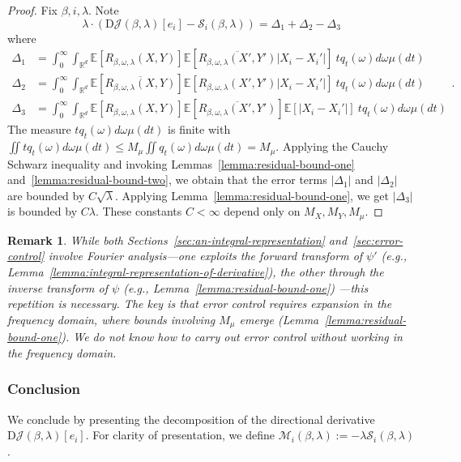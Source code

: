 \documentclass[sn-mathphys-num]{sn-jnl}%
\numberwithin{equation}{section}
\newcommand{\R}{\mathbb{R}}
\newcommand{\E}{\mathbb{E}}
\theoremstyle{thmstyleone}%
\theoremstyle{thmstyletwo}%
\newtheorem{remark}{Remark}%
\theoremstyle{thmstylethree}%
\begin{document}
\begin{proof} 
Fix $\beta, i, \lambda$. Note 
\begin{equation*}
	\lambda \cdot (\mathrm{D}\mathcal{J}(\beta, \lambda)[e_i] -  \mathcal{S}_i(\beta, \lambda)) = \Delta_1 + \Delta_2 - \Delta_3
\end{equation*}
where 
\begin{equation*}
\begin{split} 
	\Delta_1&= \int_0^\infty \int_{\R^d} \E[R_{\beta, \omega, \lambda}(X, Y)] \E[\overline{R_{\beta, \omega, \lambda}(X', Y')}|X_i - X_i'|] ~t q_t(\omega) d\omega \mu(dt) \\
	\Delta_2&= \int_0^\infty \int_{\R^d} \E[\overline{R_{\beta, \omega, \lambda}(X, Y)}] \E[R_{\beta, \omega, \lambda}(X', Y')|X_i - X_i'|] ~t q_t(\omega) d\omega \mu(dt) \\
	\Delta_3&= \int_0^\infty \int_{\R^d} \E[R_{\beta, \omega, \lambda}(X, Y)] \E[\overline{R_{\beta, \omega, \lambda}(X', Y')}] \E[|X_i - X_i'|] ~t q_t(\omega) d\omega \mu(dt) 
\end{split}. 
\end{equation*}
The measure $t q_t(\omega) d\omega \mu(dt)$ is finite with $\iint  t q_t(\omega) d\omega \mu(dt) \le M_\mu \iint q_t(\omega) d\omega \mu(dt) = M_\mu$.
Applying the Cauchy Schwarz inequality and invoking Lemmas~\ref{lemma:residual-bound-one} and~\ref{lemma:residual-bound-two}, we obtain that the error terms $|\Delta_1|$ and $|\Delta_2|$ are bounded by $C\sqrt{\lambda}$. Applying Lemma~\ref{lemma:residual-bound-one}, we get $|\Delta_3|$ is bounded by $C\lambda$. These 
constants $C < \infty$ depend only on $M_X, M_Y, M_\mu$.

\end{proof} 

\begin{remark}
\emph{
While both Sections~\ref{sec:an-integral-representation} and~\ref{sec:error-control} involve Fourier analysis---one exploits the forward transform of $\psi'$ (e.g., Lemma~\ref{lemma:integral-representation-of-derivative}), the other through the inverse transform of $\psi$ (e.g., Lemma~\ref{lemma:residual-bound-one}) ---this repetition is necessary. The key is that error control requires expansion in the frequency domain, where bounds involving $M_\mu$ emerge (Lemma~\ref{lemma:residual-bound-one}). We do not know how to carry out error control without working in the frequency domain.
}
\end{remark}

\subsubsection{Conclusion} 
\label{sec:derivative-of-J-with-respect-to-beta-i}
We conclude by presenting the decomposition of the directional derivative $\mathrm{D}\mathcal{J}(\beta, \lambda)[e_i]$.
For clarity of presentation, we define $ \mathcal{M}_i(\beta, \lambda) := -\lambda \mathcal{S}_i(\beta, \lambda)$. 
\end{document}
